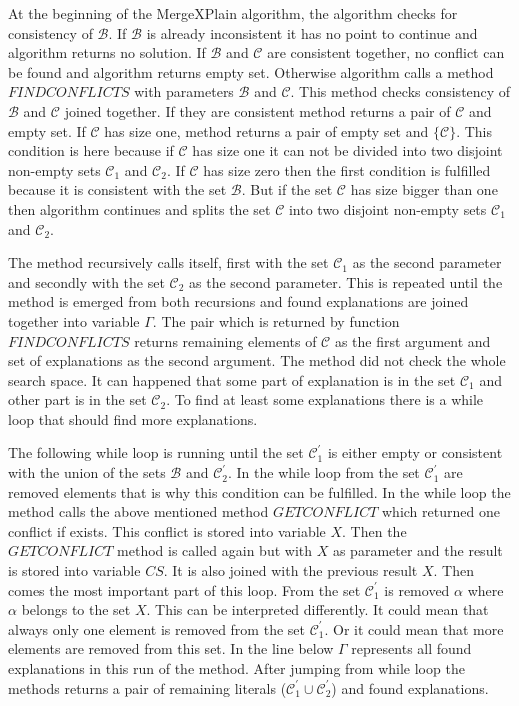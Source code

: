 \documentclass[12pt,a4paper]{article}
\begin{document}
At the beginning of the MergeXPlain algorithm, the algorithm checks for consistency of $\mathcal{B}$. If $\mathcal{B}$ is already inconsistent it has no point to continue and algorithm returns no solution. If $\mathcal{B}$ and $\mathcal{C}$ are consistent together, no conflict can be found and algorithm returns empty set. Otherwise algorithm calls a method $\mathit{FINDCONFLICTS}$ with parameters $\mathcal{B}$ and $\mathcal{C}$. This method checks consistency of $\mathcal{B}$ and $\mathcal{C}$ joined together. If they are consistent method returns a pair of $\mathcal{C}$ and empty set. If $\mathcal{C}$ has size one, method returns a pair of empty set and $\{ \mathcal{C} \}$. This condition is here because if $\mathcal{C}$ has size one it can not be divided into two disjoint non-empty sets $\mathcal{C}_{1}$ and $\mathcal{C}_{2}$. If $\mathcal{C}$ has size zero then the first condition is fulfilled because it is consistent with the set $\mathcal{B}$. But if the set $\mathcal{C}$ has size bigger than one then algorithm continues and splits the set $\mathcal{C}$ into two disjoint non-empty sets $\mathcal{C}_{1}$ and $\mathcal{C}_{2}$. 

The method recursively calls itself, first with the set $\mathcal{C}_{1}$ as the second parameter and secondly with the set $\mathcal{C}_{2}$ as the second parameter. This is repeated until the method is emerged from both recursions and found explanations are joined together into variable $\Gamma$. The pair which is returned by function $\mathit{FINDCONFLICTS}$ returns remaining elements of $\mathcal{C}$ as the first argument and set of explanations as the second argument. The method did not check the whole search space. It can happened that some part of explanation is in the set $\mathcal{C}_{1}$ and other part is in the set $\mathcal{C}_{2}$. To find at least some explanations there is a while loop that should find more explanations. 

The following while loop is running until the set $\mathcal{C}^{\prime}_{1}$ is either empty or consistent with the union of the sets $\mathcal{B}$ and $\mathcal{C}^{\prime}_{2}$. In the while loop from the set $\mathcal{C}^{\prime}_{1}$ are removed elements that is why this condition can be fulfilled. In the while loop the method calls the above mentioned method $\mathit{GETCONFLICT}$ which returned one conflict if exists. This conflict is stored into variable $X$. Then the $\mathit{GETCONFLICT}$ method is called again but with $X$ as parameter and the result is stored into variable $CS$. It is also joined with the previous result $X$. Then comes the most important part of this loop. From the set $\mathcal{C}^{\prime}_{1}$ is removed $\alpha$ where $\alpha$ belongs to the set $X$. This can be interpreted differently. It could mean that always only one element is removed from the set $\mathcal{C}^{\prime}_{1}$. Or it could mean that more elements are removed from this set. In the line below $\Gamma$ represents all found explanations in this run of the method. After jumping from while loop the methods returns a pair of remaining literals ($\mathcal{C}^{\prime}_{1} \cup \mathcal{C}^{\prime}_{2}$) and found explanations.
\end{document}
